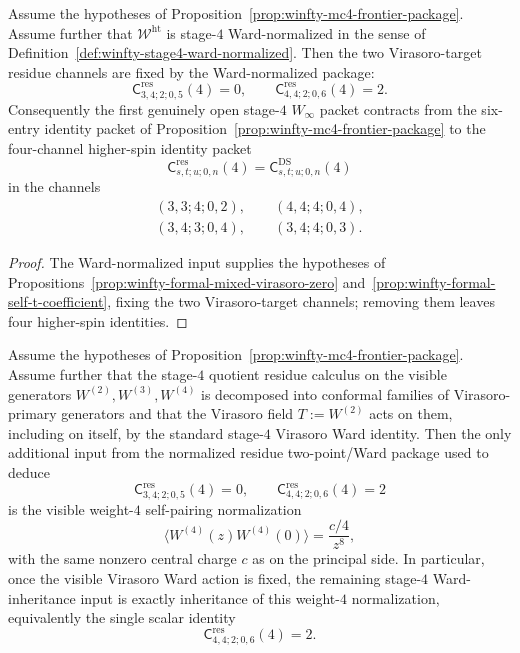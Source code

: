 \begin{corollary}
\label{cor:winfty-stage4-residue-four-channel}
Assume the hypotheses of
Proposition~\ref{prop:winfty-mc4-frontier-package}. Assume further
that $\mathcal{W}^{\mathrm{ht}}$ is stage-$4$ Ward-normalized in the
sense of Definition~\ref{def:winfty-stage4-ward-normalized}. Then the
two
Virasoro-target residue channels are fixed by the Ward-normalized
package:
\[
\mathsf{C}^{\mathrm{res}}_{3,4;2;0,5}(4)=0,
\qquad
\mathsf{C}^{\mathrm{res}}_{4,4;2;0,6}(4)=2.
\]
Consequently the first genuinely open stage-$4$
\texorpdfstring{$W_\infty$}{W_infty} packet contracts from the six-entry
identity packet of Proposition~\ref{prop:winfty-mc4-frontier-package} to
the four-channel higher-spin identity packet
\[
\mathsf{C}^{\mathrm{res}}_{s,t;u;0,n}(4)
=
\mathsf{C}^{\mathrm{DS}}_{s,t;u;0,n}(4)
\]
in the channels
\[
\begin{gathered}
(3,3;4;0,2),\qquad
(4,4;4;0,4),\\
(3,4;3;0,4),\qquad
(3,4;4;0,3).
\end{gathered}
\]
\end{corollary}

\begin{proof}
The Ward-normalized input supplies the hypotheses of Propositions~\ref{prop:winfty-formal-mixed-virasoro-zero} and~\ref{prop:winfty-formal-self-t-coefficient}, fixing the two Virasoro-target channels; removing them leaves four higher-spin identities.
\end{proof}

\begin{proposition}
\label{prop:winfty-stage4-visible-pairing-gap}
Assume the hypotheses of
Proposition~\ref{prop:winfty-mc4-frontier-package}. Assume further
that the stage-$4$ quotient residue calculus on the visible generators
$W^{(2)},W^{(3)},W^{(4)}$ is decomposed into conformal families of
Virasoro-primary generators and that the Virasoro field $T:=W^{(2)}$
acts on them, including on itself, by the standard stage-$4$
Virasoro Ward identity. Then the only additional input from the
normalized residue two-point/Ward package used to deduce
\[
\mathsf{C}^{\mathrm{res}}_{3,4;2;0,5}(4)=0,
\qquad
\mathsf{C}^{\mathrm{res}}_{4,4;2;0,6}(4)=2
\]
is the visible weight-$4$ self-pairing normalization
\[
\langle W^{(4)}(z)W^{(4)}(0)\rangle=\frac{c/4}{z^{8}},
\]
with the same nonzero central charge $c$ as on the principal side.
In particular, once the visible Virasoro Ward action is fixed, the
remaining stage-$4$ Ward-inheritance input is exactly inheritance of
this weight-$4$ normalization, equivalently the single scalar identity
\[
\mathsf{C}^{\mathrm{res}}_{4,4;2;0,6}(4)=2.
\]
\end{proposition}

